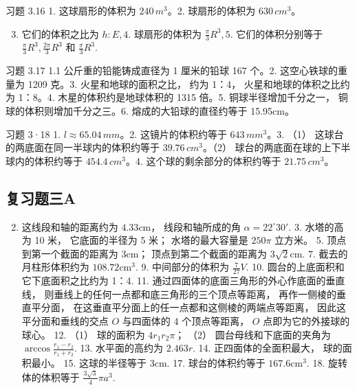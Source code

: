 习题 3.16 1. 这球扇形的体积为 \(240 \, m^{3}\)。2. 球扇形的体积为
\(630 \, cm^{3}\)。

\begin{enumerate}
\setcounter{enumi}{2}
\item
  它们的体积之比为 \(h: E, 4\). 球扇形的体积为 \(\frac{\pi}{3} R^3, 5\).
  它们的体积分别等于 \(\frac{\pi}{3} R^3, \frac{2\pi}{3} R^3\) 和
  \(\frac{\pi}{3} R^3\).
\end{enumerate}

习题 3.17 1.1 公斤重的铅能铸成直径为 1 厘米的铅球 167 个。2.
这空心铁球的重量为 1209 克。3. 火星和地球的面积之比， 约为 1：4，
火星和地球的体积之比约为 1：8。4. 木星的体积约是地球体积的 1315 倍。5.
铜球半径增加千分之一， 铜球的体积则增加千分之三。6.
熔成的大铅球的直径约等于 15.95cm。

习题 3·18 1. \(l \approx 65.04 \, mm\)。2. 这镜片的体积约等于
\(643 \, mm^{3}\)。3. （1） 这球台的两底面在同一半球内的体积约等于
\(39.76 \, cm^{3}\)。（2） 球台的两底面在球的上下半球内的体积约等于
\(454.4 \, cm^{3}\)。4. 这个球的剩余部分的体积约等于
\(21.75 \, cm^{3}\)。

\subsection{复习题三A}

\begin{enumerate}
\setcounter{enumi}{1}
\item
  这线段和轴的距离约为 \(4.33\mathrm{cm}\)， 线段和轴所成的角
  \(\alpha = 22^{\circ}30'\). 3. 水塔的高为 10 米， 它底面的半径为 5
  米； 水塔的最大容量是 \(250\pi\) 立方米。 5. 顶点到第一个截面的距离为
  \(3\mathrm{cm}\)； 顶点到第二个截面的距离为 \(3\sqrt{2}\mathrm{cm}\).
  7. 截去的月柱形体积约为 \(108.72\mathrm{cm}^{3}\). 9. 中间部分的体积为
  \(\frac{7}{27} V\). 10. 圆台的上底面积和它下底面积之比约为 1：4. 11.
  通过四面体的底面三角形的外心作底面的垂直线，
  则垂线上的任何一点都和底三角形的三个顶点等距离，
  再作一侧棱的垂直平分面，
  在这垂直平分面上的任一点都和这侧棱的两端点等距离，
  因此这平分面和垂线的交点 \(O\) 与四面体的 4 个顶点等距离， \(O\)
  点即为它的外接球的球心。 12. （1） 球的面积为 \(4r_1r_2\pi\)； （2）
  圆台母线和下底面的夹角为 \(\arccos \frac{r_1 - r_2}{r_1 + r_2}\). 13.
  水平面的高约为 \(2.463r\). 14. 正四面体的全面积最大， 球的面积最小。
  15. 这球的半径等于 \(3\mathrm{cm}\). 17. 球台的体积约等于
  \(167.6\mathrm{cm}^3\). 18. 旋转体的体积等于
  \(\frac{3\sqrt{3}}{4}\pi a^3\).
\end{enumerate}


